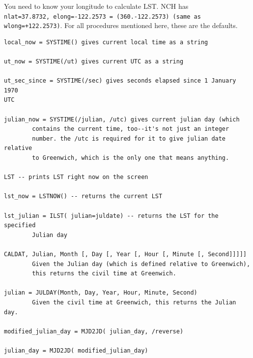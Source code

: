 \documentclass[12pt,preprint]{aastex}
\begin{document}
You need to know your
longitude to calculate LST. NCH has \\
{\tt nlat=37.8732, elong=-122.2573 = (360.-122.2573) (same as wlong=+122.2573)}. For all
procedures mentioned here, these are the defaults.

\begin{verbatim}
local_now = SYSTIME() gives current local time as a string

ut_now = SYSTIME(/ut) gives current UTC as a string

ut_sec_since = SYSTIME(/sec) gives seconds elapsed since 1 January 1970
UTC

julian_now = SYSTIME(/julian, /utc) gives current julian day (which             
        contains the current time, too--it's not just an integer               
        number. the /utc is required for it to give julian date relative       
        to Greenwich, which is the only one that means anything.               
                                                                               
LST -- prints LST right now on the screen                                      
                                                                               
lst_now = LSTNOW() -- returns the current LST                                   
                                                                               
lst_julian = ILST( julian=juldate) -- returns the LST for the specified        
        Julian day                                                             
                                                                               
CALDAT, Julian, Month [, Day [, Year [, Hour [, Minute [, Second]]]]]          
        Given the Julian day (which is defined relative to Greenwich),         
        this returns the civil time at Greenwich.                              
                                                                               
julian = JULDAY(Month, Day, Year, Hour, Minute, Second)                        
        Given the civil time at Greenwich, this returns the Julian day.

modified_julian_day = MJD2JD( julian_day, /reverse)                            

julian_day = MJD2JD( modified_julian_day)                                      
\end{verbatim}
\end{document}
